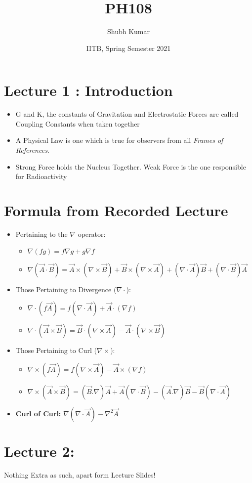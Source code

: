 \documentclass{article}
\title{PH108}
\author{Shubh Kumar}
\date{IITB, Spring Semester 2021}
\begin{document}
\maketitle

\section{Lecture 1 : Introduction}

\begin{itemize}
    \item G and K, the constants of Gravitation and Electrostatic Forces are called Coupling Constants when taken together

    \item A Physical Law is one which is true for observers from all \textit{Frames of References}.

    \item Strong Force holds the Nucleus Together. Weak Force is the one responsible for Radioactivity
\end{itemize}

\section{Formula from Recorded Lecture}
\begin{itemize}
    \item Pertaining to the $\nabla$ operator:
        \begin{itemize}
            \item $\nabla (fg) = f\nabla g + g\nabla f$
            \item $\nabla (\vec{A} \cdot \vec{B}) = \vec{A} \times ( \nabla \times \vec{B}) + \vec{B} \times ( \nabla \times \vec{A})+
            (\nabla \cdot \vec{A})\vec{B} + (\nabla \cdot \vec{B})\vec{A}$
        \end{itemize}




\item Those Pertaining to Divergence ($\nabla \cdot$):
        \begin{itemize}
            \item $\nabla \cdot (f\vec{A}) = f(\nabla \cdot \vec{A}) + \vec{A} \cdot (\nabla f)$
            \item $\nabla \cdot (\vec{A} \times \vec{B}) = \vec{B} \cdot (\nabla \times \vec{A})-\vec{A} \cdot (\nabla \times \vec{B})$
        \end{itemize}
\item Those Pertaining to Curl ($\nabla \times$):
\begin{itemize}
    \item $\nabla \times (f\vec{A}) = f(\nabla \times \vec{A}) - \vec{A} \times (\nabla f)$
    \item $\nabla \times (\vec{A} \times \vec{B}) = (\vec{B}. \nabla)\vec{A} + \vec{A} (\nabla \cdot \vec{B})-(\vec{A}. \nabla)\vec{B}-\vec{B} (\nabla \cdot \vec{A})$
\end{itemize}

\item \textbf{Curl of Curl:} $\nabla (\nabla \cdot \vec{A})- \nabla^{2}\vec{A}$
\end{itemize}

\section{Lecture 2: }
Nothing Extra as such, apart form Lecture Slides!
\end{document}
